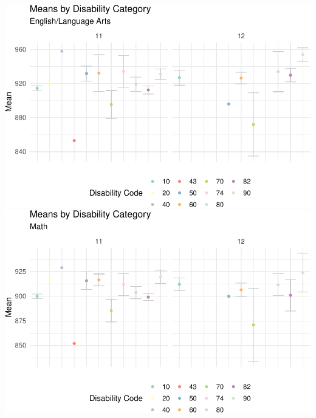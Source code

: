 \documentclass[]{article}
\begin{document}
\FloatBarrier

\includegraphics{Critical_Element_4_files/figure-latex/plots11-1.pdf}
\includegraphics{Critical_Element_4_files/figure-latex/plots11-2.pdf}

\FloatBarrier

\FloatBarrier
\end{document}
